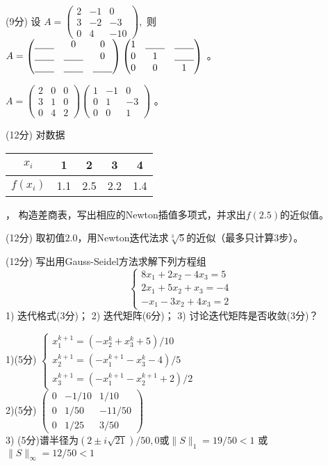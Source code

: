\documentclass[12pt,letter]{ustcexam}
\def\ds{\displaystyle}
\begin{document}
\begin{problems}
\question (9分) 设 $ \ds{A=\begin {pmatrix} 2 & -1 & 0 \\
3 & -2 & -3 \\ 0 & 4 & -10 \end {pmatrix}}$,\  则 
$ A=\begin{pmatrix} \underline{\hspace{1em}}\hspace{0.001em}\underline{\hspace{1em}}\hspace{0.001em} & 0 & 0 \\ \underline{\hspace{1em}}\hspace{0.001em}\underline{\hspace{1em}}\hspace{0.001em} & \underline{\hspace{1em}}\hspace{0.001em}\underline{\hspace{1em}}\hspace{0.001em} & 0 \\ \underline{\hspace{1em}}\hspace{0.001em}\underline{\hspace{1em}}\hspace{0.001em} & \underline{\hspace{1em}}\hspace{0.001em}\underline{\hspace{1em}}\hspace{0.001em} &\underline{\hspace{1em}}\hspace{0.001em}\underline{\hspace{1em}}\hspace{0.001em}
\end{pmatrix} \begin{pmatrix} 1 & \underline{\hspace{1em}}\hspace{0.001em}\underline{\hspace{1em}}\hspace{0.001em} & \underline{\hspace{1em}}\hspace{0.001em}\underline{\hspace{1em}}\hspace{0.001em} \\ 0 & 1 & \underline{\hspace{1em}}\hspace{0.001em}\underline{\hspace{1em}}\hspace{0.001em} \\ 0 & 0 & 1 
\end{pmatrix} $ 。
\begin{sol}
$ A=\begin{pmatrix} 2 & 0 & 0 \\ 3 & 1 & 0 \\ 0 & 4 & 2\end{pmatrix}
 \begin{pmatrix} 1 & -1 & 0 \\ 0 & 1 & -3 \\ 0 & 0 & 1 
\end{pmatrix} $ 。
\end{sol}

\newpage
{}
\qu (12分) 对数据 
\begin{tabular}{c|cccc} $x_i$  & 1 & 2 & 3 & 4
\\\hline $f(x_i)$ & 1.1 & 2.5 & 2.2 & 1.4
\end{tabular} ，
构造差商表，写出相应的Newton插值多项式，并求出$f(2.5)$的近似值。

\vspace*{0.4\textheight}

\qu (12分) 取初值$2.0$，用Newton迭代法求$\sqrt[3]{5}$的近似（最多只计算3步）。

\newpage
\qu (12分)  写出用Gauss-Seidel方法求解下列方程组
$$\begin {cases} 8x_1+2x_2-4x_3=5\\ 2 x_1+5x_2+ x_3=-4 \\ -x_1-3x_2+4x_3=2
\end{cases}$$
1) 迭代格式(3分)；  2) 迭代矩阵(6分)； 3) 讨论迭代矩阵是否收敛(3分)？
\begin{sol}
1)(5分)
$
\left\{\begin{array}{l}
x_1^{k+1}=(-x_2^k+x_3^k+5)/10 \\
x_2^{k+1}=(-x_1^{k+1}-x_3^k-4)/5 \\
x_3^{k+1}=(-x_1^{k+1}-x_2^{k+1}+2)/2
\end{array}\right.
$ \\
2)(5分)
$
\left(\begin{array}{ccc}
0 & -1/10 & 1/10 \\
0 & 1/50 & -11/50 \\
0 & 1/25 & 3/50
\end{array}\right)
$ \\
3) (5分)谱半径为$(2\pm i\sqrt{21})/50,0$或$\|S\|_1=19/50<1$
   或$\|S\|_{\infty}=12/50<1$
\end{sol}


\end{problems}
\end{document}
